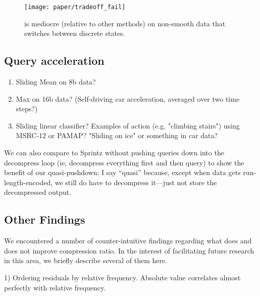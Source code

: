 \begin{figure}[h]
\begin{center}
    \texttt{[image: paper/tradeoff\_fail]}
    \caption{\minesp is mediocre (relative to other methods) on non-smooth data that switches between discrete states.}
    \label{fig:tradeoff_failure}
\end{center}
\end{figure}

\subsection{Query acceleration}

\begin{enumerate}
\item Sliding Mean on 8b data?
\item Max on 16b data? (Self-driving car acceleration, averaged over two time steps?)
\item Sliding linear classifier? Examples of action (e.g. "climbing stairs") using MSRC-12 or PAMAP? "Sliding on ice" or something in car data?
\end{enumerate}

We can also compare to Sprintz without pushing queries down into the decompress loop (ie, decompress everything first and then query) to show the benefit of our quasi-pushdown; I say ``quasi'' because, except when data gets run-length-encoded, we still do have to decompress it---just not store the decompressed output.

\subsection{Other Findings}

We encountered a number of counter-intuitive findings regarding what does and does not improve compression ratio. In the interest of facilitating future research in this area, we briefly describe several of them here.

1) Ordering residuals by relative frequency. Absolute value correlates almost perfectly with relative frequency. %

